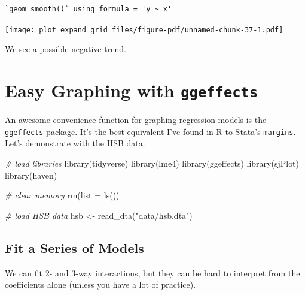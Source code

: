 \documentclass[
  letterpaper,
  DIV=11,
  numbers=noendperiod]{scrreprt}
\newenvironment{Shaded}{}{}
\newcommand{\AttributeTok}[1]{\textcolor[rgb]{0.49,0.56,0.16}{#1}}
\newcommand{\CommentTok}[1]{\textcolor[rgb]{0.38,0.63,0.69}{\textit{#1}}}
\newcommand{\FunctionTok}[1]{\textcolor[rgb]{0.02,0.16,0.49}{#1}}
\newcommand{\NormalTok}[1]{#1}
\newcommand{\OtherTok}[1]{\textcolor[rgb]{0.00,0.44,0.13}{#1}}
\newcommand{\StringTok}[1]{\textcolor[rgb]{0.25,0.44,0.63}{#1}}
\begin{document}
\begin{verbatim}
`geom_smooth()` using formula = 'y ~ x'
\end{verbatim}

\texttt{[image: plot\_expand\_grid\_files/figure-pdf/unnamed-chunk-37-1.pdf]}

We see a possible negative trend.

\chapter{\texorpdfstring{Easy Graphing with
\texttt{ggeffects}}{Easy Graphing with ggeffects}}\label{easy-graphing-with-ggeffects}

An awesome convenience function for graphing regression models is the
\texttt{ggeffects} package. It's the best equivalent I've found in R to
Stata's \texttt{margins}. Let's demonstrate with the HSB data.

\begin{Shaded}
\begin{Highlighting}[]
\CommentTok{\# load libraries}
\FunctionTok{library}\NormalTok{(tidyverse)}
\FunctionTok{library}\NormalTok{(lme4)}
\FunctionTok{library}\NormalTok{(ggeffects)}
\FunctionTok{library}\NormalTok{(sjPlot)}
\FunctionTok{library}\NormalTok{(haven)}

\CommentTok{\# clear memory}
\FunctionTok{rm}\NormalTok{(}\AttributeTok{list =} \FunctionTok{ls}\NormalTok{())}

\CommentTok{\# load HSB data}
\NormalTok{hsb }\OtherTok{\textless{}{-}} \FunctionTok{read\_dta}\NormalTok{(}\StringTok{"data/hsb.dta"}\NormalTok{)}
\end{Highlighting}
\end{Shaded}

\section{Fit a Series of Models}\label{fit-a-series-of-models}

We can fit 2- and 3-way interactions, but they can be hard to interpret
from the coefficients alone (unless you have a lot of practice).
\end{document}
